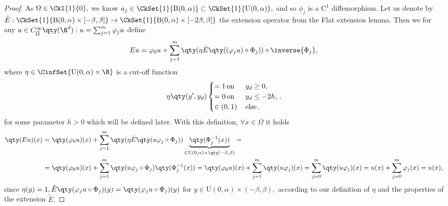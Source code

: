 \begin{proof}
	As $\Omega \in \Ckl{1}{0},$ we know $a_j \in \CkSet{1}{\text{B}(0,\alpha)}\subset \CkSet{1}{\text{U}(0,\alpha)},$ and so $\phi_j$ is a $\text{C}^1$ diffemorphism. Let us denote by $\tilde{E}: \CkSet{1}{\text{B}(0,\alpha)\times [-\beta, \beta]} \to \CkSet{1}{\text{B}(0,\alpha)\times [-2 \beta, \beta]}$ the extension operator from the Flat extension lemma. Then we for any $u \in C^{\infty}_{\overline{\Omega}}\qty(\R^d): u = \sum_{j=1}^m \varphi_j u$ define
	\[
		Eu=\varphi_0 u + \sum_{j=1}^m \qty(\eta \tilde{E}\qty((\varphi_j u) \circ \Phi_j)) \circ \inverse{\Phi_j},
	\]
	where $\eta \in \CinfSet{\text{U}(0,\alpha)\times \R}$ is a cut-off function
	\begin{equation*}
		\eta\qty(y',y_d)  
		\begin{cases}
			=1 \, \text{on} \, &y_d \geq 0,\\
			= 0 \, \text{on} \,& y_d \leq -2h, \\
			\in (0,1) \, &\text{else} \,.
		\end{cases},
	\end{equation*}
for some parameter $h>0$ which will be defined later.
With this definition, $\forall x \in \Omega$ it holds
\begin{align*}
	\qty(Eu)(x) &= \qty(\varphi_0 u)(x) + \sum_{j=1}^{m}\qty(\eta \tilde{E}\qty(u \varphi_j \circ \Phi_j))\underbrace{\qty(\Phi_j^{-1}(x))}_{\in \text{U}(0,\alpha)\times \qty(-\beta, \beta)} =\\
	&= \qty(\varphi_0 u)(x) + \sum_{j=1}^m \qty(u \varphi_j \circ \Phi_j)\qty(\Phi_j^{-1}(x)) = \qty(\varphi_0 u)(x) + \sum_{j=1}^m \qty(u \varphi_j)(x) = \sum_{j=0}^m \qty(u \varphi_j)(x) = u(x) + \sum_{j=0}^m \varphi_j(x) = u(x),
\end{align*}
since $\eta(y) = 1, \tilde{E}\qty(\varphi_j u \circ \Phi_j) (y) = \qty(\varphi_j u \circ \Phi_j)(y)$ for $y \in \text{U}(0,\alpha) \times (-\beta, \beta), $ according to our definition of $\eta$ and the properties of the extension $\tilde{E}.$


\end{proof}
